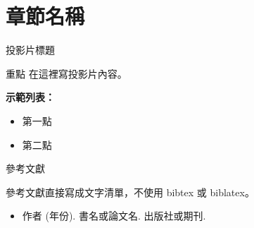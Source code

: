 
\section{章節名稱}
\begin{frame}{投影片標題}

\begin{highlightbox}{重點}
在這裡寫投影片內容。
\end{highlightbox}

\vspace{0.3cm}

\textbf{示範列表：}
\begin{itemize}
    \item 第一點
    \item 第二點
\end{itemize}

\end{frame}

\begin{frame}{參考文獻}

參考文獻直接寫成文字清單，不使用 bibtex 或 biblatex。

\begin{itemize}
    \item 作者 (年份). 書名或論文名. 出版社或期刊.
\end{itemize}

\end{frame}
